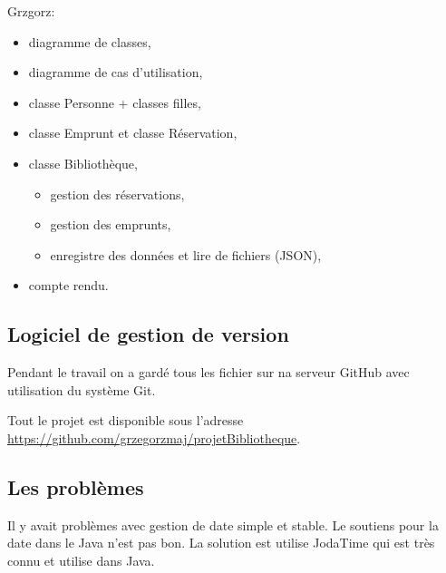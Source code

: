 \documentclass[10pt, a4paper]{article}
\begin{document}
		
		Grzgorz:
		\begin{itemize}
			\item diagramme de classes,
			\item diagramme de cas d'utilisation,			
			\item classe Personne + classes filles,
			\item classe Emprunt et classe Réservation,
			\item classe Bibliothèque,
			\begin{itemize}
				\item gestion des réservations,
				\item gestion des emprunts,
				\item enregistre des données et lire de fichiers (JSON),
			\end{itemize}
			\item compte rendu.
		\end{itemize}
		
		
		\subsection{Logiciel de gestion de version}
		Pendant le travail on a gardé tous les fichier sur na serveur GitHub avec utilisation du système 
		Git.
		
		Tout le projet est disponible sous l'adresse
		\url{https://github.com/grzegorzmaj/projetBibliotheque}.
		
		\subsection{Les problèmes}
		Il y avait problèmes avec gestion de date simple et stable. Le soutiens pour la date dans le Java 
		n'est pas bon. La solution est utilise JodaTime qui est très connu et utilise dans Java.
		
	


\end{document}
